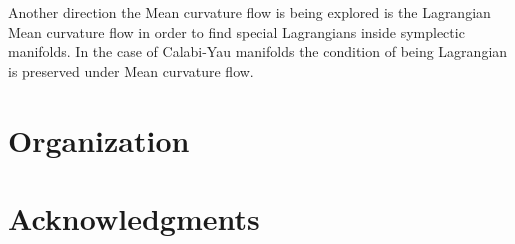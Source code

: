 Another direction the Mean curvature flow is being explored is the Lagrangian Mean curvature flow in order to find special Lagrangians inside symplectic manifolds. In the case of Calabi-Yau manifolds the condition of being Lagrangian is preserved under Mean curvature flow.


\section*{Organization}

\section*{Acknowledgments}